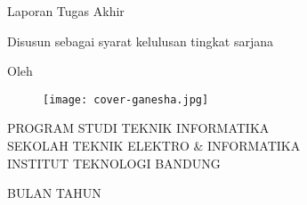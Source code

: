 \clearpage
\pagestyle{empty}

\begin{center}
  \smallskip

  \Large \bfseries \MakeUppercase{\thetitle}
  \vfill

  \Large Laporan Tugas Akhir
  \vfill

  \large Disusun sebagai syarat kelulusan tingkat sarjana
  \vfill

  \large Oleh

  \Large \theauthor

  \vfill
  \begin{figure}[!h]
    \centering
    \texttt{[image: cover-ganesha.jpg]}
  \end{figure}
  \vfill

  \large
  \uppercase{
    Program Studi Teknik Informatika \\
    Sekolah Teknik Elektro \& Informatika \\
    Institut Teknologi Bandung
  }

  {{BULAN}} {{TAHUN}}

\end{center}

\clearpage
